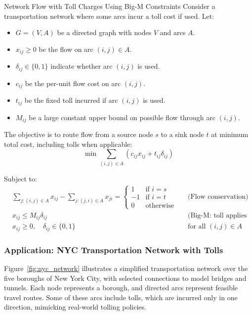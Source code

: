 \begin{example}{Network Flow with Toll Charges Using Big-M Constraints}{}
Consider a transportation network where some arcs incur a toll cost if used. Let:
\begin{itemize}
  \item \( G = (V, A) \) be a directed graph with nodes \(V\) and arcs \(A\).
  \item \( x_{ij} \geq 0 \) be the flow on arc \((i,j) \in A\).
  \item \( \delta_{ij} \in \{0,1\} \) indicate whether arc \((i,j)\) is used.
  \item \( c_{ij} \) be the per-unit flow cost on arc \((i,j)\).
  \item \( t_{ij} \) be the fixed toll incurred if arc \((i,j)\) is used.
  \item \( M_{ij} \) be a large constant upper bound on possible flow through arc \((i,j)\).
\end{itemize}

The objective is to route flow from a source node \(s\) to a sink node \(t\) at minimum total cost, including tolls when applicable:
\[
\min \sum_{(i,j) \in A} \left( c_{ij} x_{ij} + t_{ij} \delta_{ij} \right)
\]

\noindent Subject to:
\begin{align*}
  &\sum_{j: (i,j) \in A} x_{ij} - \sum_{j: (j,i) \in A} x_{ji} =
  \begin{cases}
    1 & \text{if } i = s \\
    -1 & \text{if } i = t \\
    0 & \text{otherwise}
  \end{cases} &&\text{(Flow conservation)} \\
  &x_{ij} \le M_{ij} \delta_{ij} &&\text{(Big-M: toll applies only if arc is used)} \\
  &x_{ij} \ge 0, \quad \delta_{ij} \in \{0,1\} &&\text{for all } (i,j) \in A
\end{align*}

\end{example}

\subsubsection{Application: NYC Transportation Network with Tolls}

Figure~\ref{fig:nyc_network} illustrates a simplified transportation network over the five boroughs of New York City, with selected connections to model bridges and tunnels. Each node represents a borough, and directed arcs represent feasible travel routes. Some of these arcs include tolls, which are incurred only in one direction, mimicking real-world tolling policies.

